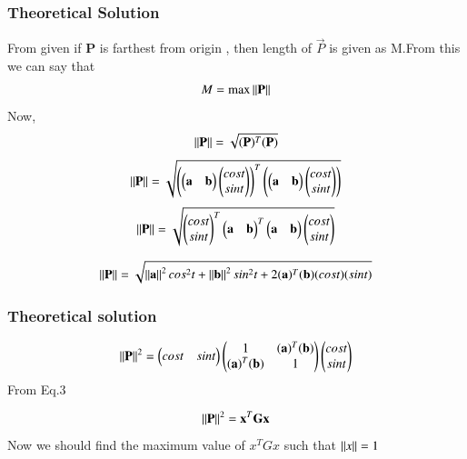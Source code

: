 \documentclass{beamer}
\begin{document}
\begin{frame}
\frametitle{Theoretical Solution}
From given if \textbf{P} is farthest from origin , then length of $\vec{P}$ is given as M.From this we can say  that
\begin{align}
   M=\text{max}\norm{\Vec{P}}
\end{align}
Now,
\begin{align}
    \norm{\Vec{P}}=\sqrt{(\Vec{P})^T(\Vec{P})}
\end{align}
\begin{align}
    \norm{\Vec{P}}=\sqrt{\brak{\myvec{\vec{a}&\vec{b}}\myvec{cost\\sint}}^T\brak{\myvec{\vec{a}&\vec{b}}\myvec{cost\\sint}}}
\end{align}
\begin{align}
    \norm{\Vec{P}}=\sqrt{\myvec{cost\\sint}^T\myvec{\vec{a}&\vec{b}}
    ^T\myvec{\vec{a}&\vec{b}}\myvec{cost\\sint}}
\end{align}

\begin{align}
   \norm{\Vec{P}}=\sqrt{\norm{\Vec{a}}^2cos^2t+ \norm{\Vec{b}}^2sin^2t+2(\Vec{a})^T(\Vec{b})(cost)(sint)}
\end{align}



\end{frame}
\begin{frame}
\frametitle{Theoretical solution}
\begin{align}
       \norm{\Vec{P}}^2=\myvec{cost & sint}\myvec{1&(\Vec{a})^T(\Vec{b})\\(\Vec{a})^T(\Vec{b})&1}\myvec{cost\\sint}
\end{align}
From Eq.3 

\begin{align}
\norm{\Vec{P}}^2=\Vec{x}^T\vec{G}\Vec{x}
  \end{align}
Now we should find the maximum value of \textbf{$x^TGx$} such that $\left\lVert x\right\rVert=1$\\


\end{frame}
\end{document}
